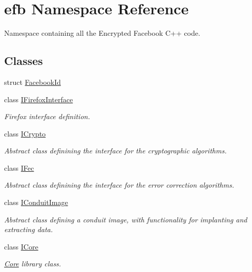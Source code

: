 \hypertarget{namespaceefb}{
\section{efb Namespace Reference}
\label{namespaceefb}
}


Namespace containing all the Encrypted Facebook C++ code.  


\subsection*{Classes}
\begin{DoxyCompactItemize}
\item 
struct \hyperlink{structefb_1_1FacebookId}{FacebookId}
\item 
class \hyperlink{classefb_1_1IFirefoxInterface}{IFirefoxInterface}
\begin{DoxyCompactList}\small\item\em Firefox interface definition. \item\end{DoxyCompactList}\item 
class \hyperlink{classefb_1_1ICrypto}{ICrypto}
\begin{DoxyCompactList}\small\item\em Abstract class definining the interface for the cryptographic algorithms. \item\end{DoxyCompactList}\item 
class \hyperlink{classefb_1_1IFec}{IFec}
\begin{DoxyCompactList}\small\item\em Abstract class definining the interface for the error correction algorithms. \item\end{DoxyCompactList}\item 
class \hyperlink{classefb_1_1IConduitImage}{IConduitImage}
\begin{DoxyCompactList}\small\item\em Abstract class defining a conduit image, with functionality for implanting and extracting data. \item\end{DoxyCompactList}\item 
class \hyperlink{classefb_1_1ICore}{ICore}
\begin{DoxyCompactList}\small\item\em \hyperlink{classefb_1_1Core}{Core} library class. \item\end{DoxyCompactList}\item 

\end{DoxyCompactItemize}
